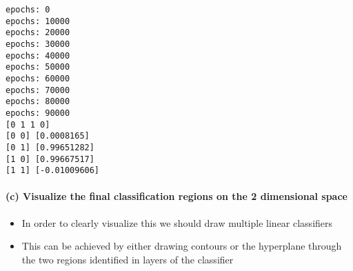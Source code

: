 \documentclass[11pt]{article}
\providecommand{\tightlist}{%
      \setlength{\itemsep}{0pt}\setlength{\parskip}{0pt}}
\begin{document}
    \begin{Verbatim}[commandchars=\\\{\}]
epochs: 0
epochs: 10000
epochs: 20000
epochs: 30000
epochs: 40000
epochs: 50000
epochs: 60000
epochs: 70000
epochs: 80000
epochs: 90000
[0 1 1 0]
[0 0] [0.0008165]
[0 1] [0.99651282]
[1 0] [0.99667517]
[1 1] [-0.01009606]

    \end{Verbatim}

    \paragraph{(c) Visualize the final classification regions on the 2
dimensional
space}\label{c-visualize-the-final-classification-regions-on-the-2-dimensional-space}

\begin{itemize}
\tightlist
\item
  In order to clearly visualize this we should draw multiple linear
  classifiers
\item
  This can be achieved by either drawing contours or the hyperplane
  through the two regions identified in layers of the classifier
\end{itemize}
\end{document}
